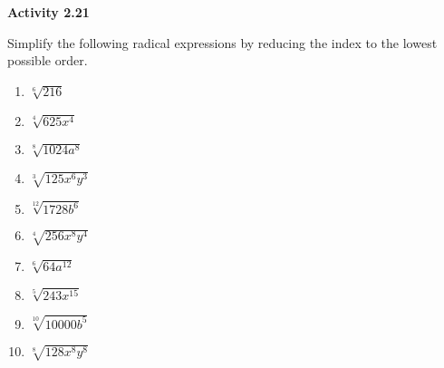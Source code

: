 \vspace{1ex}
\noindent\textbf{Activity 2.21}

\vspace{0.75ex}

Simplify the following radical expressions by reducing the index to the lowest possible order.

\begin{multicols}{2}
\begin{enumerate}[noitemsep, label = \color{blue}\arabic*. ]
    \item $\sqrt[{\scriptstyle 6}]{216}$
    \item $\sqrt[{\scriptstyle 4}]{625x^4}$
    \item $\sqrt[{\scriptstyle 8}]{1024a^8}$
    \item $\sqrt[{\scriptstyle 3}]{125x^6y^3}$
    \item $\sqrt[{\scriptstyle 12}]{1728b^{6}}$
    \item $\sqrt[{\scriptstyle 4}]{256x^8y^4}$
    \item $\sqrt[{\scriptstyle 6}]{64a^12}$
    \item $\sqrt[{\scriptstyle 5}]{243x^{15}}$
    \item $\sqrt[{\scriptstyle 10}]{10000b^5}$
    \item $\sqrt[{\scriptstyle 8}]{128x^8y^{8}}$
\end{enumerate}
\end{multicols}
